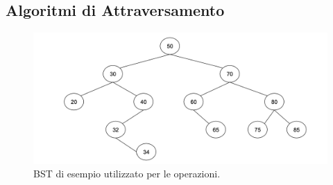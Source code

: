 \subsection{Algoritmi di Attraversamento}
\begin{figure}[h!]
    \centering
    \includegraphics[width=1\textwidth]{images/bst.png}
    \caption{BST di esempio utilizzato per le operazioni.}
    \label{fig:bst_example}
\end{figure}

